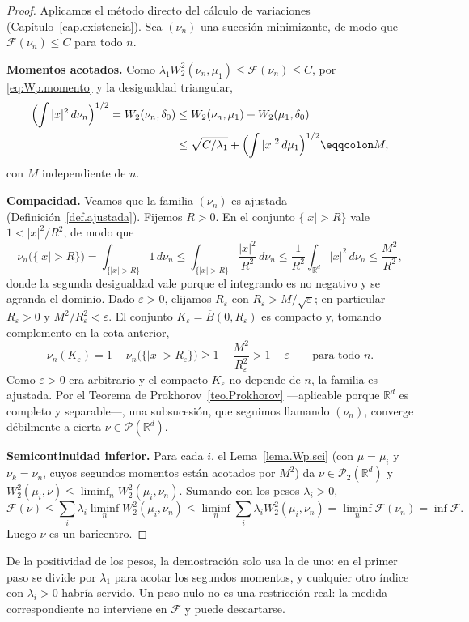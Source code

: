 \documentclass[12pt, a4paper]{amsbook}
\newcommand{\R}{{\mathbb R}}
\theoremstyle{remark}
\theoremstyle{definition}
\numberwithin{section}{chapter}
\numberwithin{subsection}{section}
\numberwithin{equation}{section}
\numberwithin{figure}{chapter}
\begin{document}
\begin{proof}
Aplicamos el método directo del cálculo de variaciones (Capítulo~\ref{cap.existencia}). Sea $(\nu_n)$ una
sucesión minimizante, de modo que $\mathcal F(\nu_n)\le C$ para todo $n$.

\medskip
\textbf{Momentos acotados.} Como $\lambda_1W_2^2(\nu_n,\mu_1)\le\mathcal F(\nu_n)\le C$,
por \eqref{eq:Wp.momento} y la desigualdad triangular,
\[
\begin{aligned}
\Bigl(\int|x|^2\,d\nu_n\Bigr)^{1/2}=W_2(\nu_n,\delta_0)
&\le W_2(\nu_n,\mu_1)+W_2(\mu_1,\delta_0)\\
&\le\sqrt{C/\lambda_1}+\Bigl(\int|x|^2\,d\mu_1\Bigr)^{1/2}\eqqcolon M,
\end{aligned}
\]
con $M$ independiente de $n$.

\medskip
\textbf{Compacidad.} Veamos que la familia $(\nu_n)$ es ajustada
(Definición~\ref{def.ajustada}). Fijemos $R>0$. En el conjunto
$\{|x|>R\}$ vale $1<|x|^2/R^2$, de modo que
\[
\nu_n\bigl(\{|x|>R\}\bigr)=\int_{\{|x|>R\}}1\,d\nu_n
\le\int_{\{|x|>R\}}\frac{|x|^2}{R^2}\,d\nu_n
\le\frac1{R^2}\int_{\R^d}|x|^2\,d\nu_n\le\frac{M^2}{R^2},
\]
donde la segunda desigualdad vale porque el integrando es no negativo y se
agranda el dominio. Dado $\varepsilon>0$, elijamos $R_\varepsilon$ con
$R_\varepsilon>M/\sqrt\varepsilon$; en particular $R_\varepsilon>0$ y
$M^2/R_\varepsilon^2<\varepsilon$. El conjunto
$K_\varepsilon=\overline B(0,R_\varepsilon)$ es compacto y, tomando
complemento en la cota anterior,
\[
\nu_n(K_\varepsilon)=1-\nu_n\bigl(\{|x|>R_\varepsilon\}\bigr)
\ge1-\frac{M^2}{R_\varepsilon^2}>1-\varepsilon
\qquad\text{para todo }n.
\]
Como $\varepsilon>0$ era arbitrario y el compacto $K_\varepsilon$ no depende
de $n$, la familia es ajustada. Por el Teorema de
Prokhorov~\ref{teo.Prokhorov} —aplicable porque $\R^d$ es completo y
separable—, una subsucesión, que seguimos llamando $(\nu_n)$, converge
débilmente a cierta $\nu\in\mathcal P(\R^d)$.

\medskip
\textbf{Semicontinuidad inferior.} Para cada $i$, el Lema~\ref{lema.Wp.sci}
(con $\mu=\mu_i$ y $\nu_k=\nu_n$, cuyos segundos momentos están acotados por
$M^2$) da $\nu\in\mathcal P_2(\R^d)$ y
$W_2^2(\mu_i,\nu)\le\liminf_nW_2^2(\mu_i,\nu_n)$. Sumando con los pesos
$\lambda_i>0$,
\[
\mathcal F(\nu)\le\sum_i\lambda_i\liminf_nW_2^2(\mu_i,\nu_n)
\le\liminf_n\sum_i\lambda_iW_2^2(\mu_i,\nu_n)=\liminf_n\mathcal F(\nu_n)=\inf\mathcal F.
\]
Luego $\nu$ es un baricentro.
\end{proof}

De la positividad de los pesos, la demostración solo usa la de uno: en el
primer paso se divide por $\lambda_1$ para acotar los segundos momentos, y
cualquier otro índice con $\lambda_i>0$ habría servido. Un peso nulo no es
una restricción real: la medida correspondiente no interviene en
$\mathcal F$ y puede descartarse.
\end{document}
